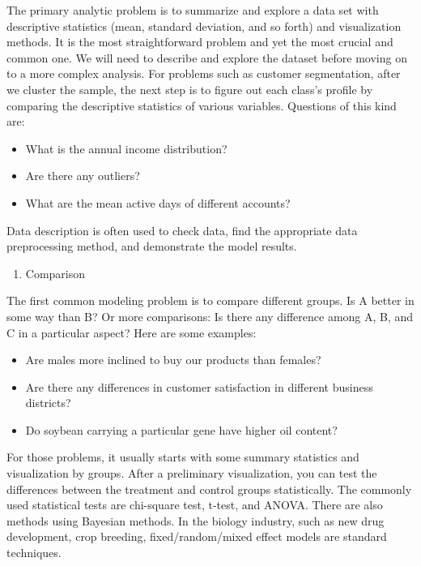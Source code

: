 \documentclass[12pt,]{krantz}
\providecommand{\tightlist}{%
  \setlength{\itemsep}{0pt}\setlength{\parskip}{0pt}}
\begin{document}
The primary analytic problem is to summarize and explore a data set with descriptive statistics (mean, standard deviation, and so forth) and visualization methods. It is the most straightforward problem and yet the most crucial and common one. We will need to describe and explore the dataset before moving on to a more complex analysis. For problems such as customer segmentation, after we cluster the sample, the next step is to figure out each class's profile by comparing the descriptive statistics of various variables. Questions of this kind are:

\begin{itemize}
\tightlist
\item
  What is the annual income distribution?
\item
  Are there any outliers?
\item
  What are the mean active days of different accounts?
\end{itemize}

Data description is often used to check data, find the appropriate data preprocessing method, and demonstrate the model results.

\begin{enumerate}
\def\labelenumi{\arabic{enumi}.}
\setcounter{enumi}{1}
\tightlist
\item
  Comparison
\end{enumerate}

The first common modeling problem is to compare different groups. Is A better in some way than B? Or more comparisons: Is there any difference among A, B, and C in a particular aspect? Here are some examples:

\begin{itemize}
\tightlist
\item
  Are males more inclined to buy our products than females?
\item
  Are there any differences in customer satisfaction in different business districts?
\item
  Do soybean carrying a particular gene have higher oil content?
\end{itemize}

For those problems, it usually starts with some summary statistics and visualization by groups. After a preliminary visualization, you can test the differences between the treatment and control groups statistically. The commonly used statistical tests are chi-square test, t-test, and ANOVA. There are also methods using Bayesian methods. In the biology industry, such as new drug development, crop breeding, fixed/random/mixed effect models are standard techniques.
\end{document}
